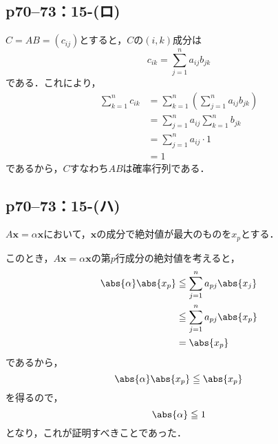 \subsection*{p70--73：15-(ロ)}

\begin{tproof}
  $C =AB=(c_{ij})$とすると，$C$の$(i,k)$成分は
  \[
    c_{ik}  =\sum_{j=1}^{n} a_{ij} b_{jk}
  \]
  である．これにより，
  \begin{align*}
    \sum_{k=1}^{n} c_{ik} & = \sum_{k=1}^{n} \left (\sum_{j=1}^{n} a_{ij} b_{jk}\right) \\
                          & = \sum_{j=1}^{n} a_{ij} \sum_{k=1}^{n} b_{jk}               \\
                          & = \sum_{j=1}^{n} a_{ij} \cdot 1                             \\
                          & = 1
  \end{align*}
  であるから，$C$すなわち$AB$は確率行列である．
\end{tproof}

\subsection*{p70--73：15-(ハ)}

\begin{tproof}
  $ A \bm{x}=\alpha \bm{x}$において，$\bm{x}$の成分で絶対値が最大のものを$x_p$とする．

  このとき，$ A \bm{x} = \alpha \bm{x}$の第$p$行成分の絶対値を考えると，
  \begin{align*}
    \abs{\alpha} \abs{x_p} & \leqq \sum_{j=1}^{n} a_{pj} \abs{x_j} \\
                           & \leqq \sum_{j=1}^{n} a_{pj} \abs{x_p} \\
                           & = \abs{x_p}
  \end{align*}
  であるから，
  \[
    \abs{\alpha} \abs{x_p} \leqq \abs{x_p}
  \]
  を得るので，
  \[
    \abs{\alpha} \leqq 1
  \]
  となり，これが証明すべきことであった．
\end{tproof}
